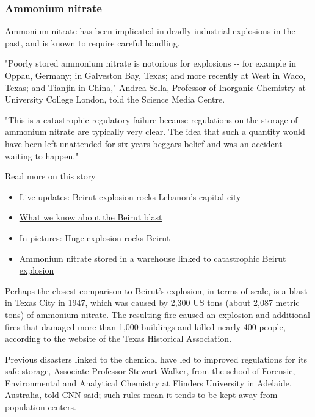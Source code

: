 \hypertarget{ammonium-nitrate}{%
\subsubsection{Ammonium nitrate}\label{ammonium-nitrate}}

Ammonium nitrate has been implicated in deadly industrial explosions in
the past, and is known to require careful handling.

"Poorly stored ammonium nitrate is notorious for explosions -\/- for
example in Oppau, Germany; in Galveston Bay, Texas; and more recently at
West in Waco, Texas; and Tianjin in China," Andrea Sella, Professor of
Inorganic Chemistry at University College London, told the Science Media
Centre.

"This is a catastrophic regulatory failure because regulations on the
storage of ammonium nitrate are typically very clear. The idea that such
a quantity would have been left unattended for six years beggars belief
and was an accident waiting to happen."

Read more on this story

\begin{itemize}
\tightlist
\item
  \href{https://cnn.com/middleeast/live-news/lebanon-beirut-explosion-live-updates-dle-intl/index.html}{Live
  updates: Beirut explosion rocks Lebanon's capital city}
\item
  \href{https://cnn.com/2020/08/05/middleeast/beirut-blast-explainer-intl-hnk/index.html}{What
  we know about the Beirut blast}
\item
  \href{https://cnn.com/2020/08/04/middleeast/gallery/beirut-explosion/index.html}{In
  pictures: Huge explosion rocks Beirut}
\item
  \href{https://cnn.com/2020/08/05/middleeast/beirut-port-explosion-ammonium-nitrate-intl-hnk/index.html}{Ammonium
  nitrate stored in a warehouse linked to catastrophic Beirut explosion}
\end{itemize}

Perhaps the closest comparison to Beirut's explosion, in terms of scale,
is a blast in Texas City in 1947, which was caused by 2,300 US tons
(about 2,087 metric tons) of ammonium nitrate. The resulting fire caused
an explosion and additional fires that damaged more than 1,000 buildings
and killed nearly 400 people, according to the website of the Texas
Historical Association.

Previous disasters linked to the chemical have led to improved
regulations for its safe storage, Associate Professor Stewart Walker,
from the school of Forensic, Environmental and Analytical Chemistry at
Flinders University in Adelaide, Australia, told CNN said; such rules
mean it tends to be kept away from population centers.

